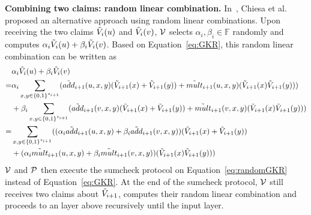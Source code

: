 \smallskip\noindent\textbf{Combining two claims: random linear combination.}  In~\cite{zksumcheck}, Chiesa et al. proposed an alternative approach using random linear combinations. Upon receiving the two claims $\tV_i(u)$ and $\tV_i(v)$, $\V$ selects $\alpha_i, \beta_i\in\mathbb{F}$ randomly and computes $\alpha_i\tV_i(u)+\beta_i\tV_i(v)$. Based on Equation~\ref{eq:GKR}, this random linear combination can be written as
\begin{align}\label{eq:randomGKR}
&\alpha_i\tV_i(u)+\beta_i\tV_i(v)\nonumber\\
=&\alpha_i\sum_{x, y \in\binary^{s_{i+1}}}(\tadd_{i+1}(u,x,y)(\tV_{i+1}(x)+\tV_{i+1}(y))+\tmult_{i+1}(u,x,y)(\tV_{i+1}(x)\tV_{i+1}(y)))\nonumber\\
&+\beta_i\sum_{x, y \in\binary^{s_{i+1}}}(\tadd_{i+1}(v,x,y)(\tV_{i+1}(x)+\tV_{i+1}(y))+\tmult_{i+1}(v,x,y)(\tV_{i+1}(x)\tV_{i+1}(y)))\nonumber\\
=&\sum_{x, y \in\binary^{s_{i+1}}}((\alpha_i\tadd_{i+1}(u,x,y)+\beta_i\tadd_{i+1}(v,x,y))(\tV_{i+1}(x)+\tV_{i+1}(y))\nonumber\\
&+(\alpha_i\tmult_{i+1}(u,x,y)+\beta_i\tmult_{i+1}(v,x,y))(\tV_{i+1}(x)\tV_{i+1}(y)))
\end{align}
$\V$ and $\P$ then execute the sumcheck protocol on Equation~\ref{eq:randomGKR} instead of Equation~\ref{eq:GKR}. At the end of the sumcheck protocol, $\V$ still receives two claims about $\tV_{i+1}$, computes their random linear combination and proceeds to an layer above recursively until the input layer.

